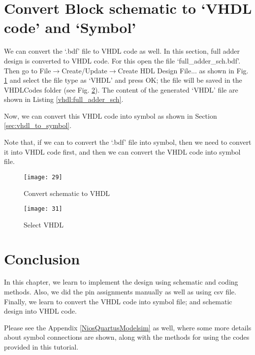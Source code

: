 \section{Convert Block schematic to `VHDL code' and `Symbol'}

We can convert the `.bdf' file to VHDL code as well. In this section, full adder design is converted to VHDL code. For this open the file `full\_adder\_sch.bdf'. Then go to File$\rightarrow$Create/Update$\rightarrow$Create HDL Design File... as shown in Fig. \ref{fig:bdf_to_vhdl} and select the file type as `VHDL' and press OK; the file will be saved in the VHDLCodes folder (see Fig. \ref{fig:to_vhdl}). The content of the generated `VHDL' file are shown in Listing \ref{vhdl:full_adder_sch}. 

Now, we can convert this VHDL code into symbol as shown in Section \ref{sec:vhdl_to_symbol}. 

\begin{noNumBox}
	Note that, if we can to convert the `.bdf' file into symbol, then we need to convert it into VHDL code first, and then we can convert the VHDL code into symbol file. 
\end{noNumBox}

\begin{figure}[!h]
	\centering
	\texttt{[image: 29]}
	\caption{Convert schematic to VHDL}
	\label{fig:bdf_to_vhdl}
\end{figure}


\begin{figure}[!h]
	\centering
	\texttt{[image: 31]}
	\caption{Select VHDL}
	\label{fig:to_vhdl}
\end{figure}



\section{Conclusion}
In this chapter, we learn to implement the design using schematic and coding methods. Also, we did the pin assignments manually as well as using csv file. Finally, we learn to convert the VHDL code into symbol file; and schematic design into VHDL code. 

\begin{noNumBox}
	Please see the Appendix \ref{NiosQuartusModelsim}  as well, where some more details about symbol connections are shown, along with the methods for using the codes provided in this tutorial. 
\end{noNumBox}
